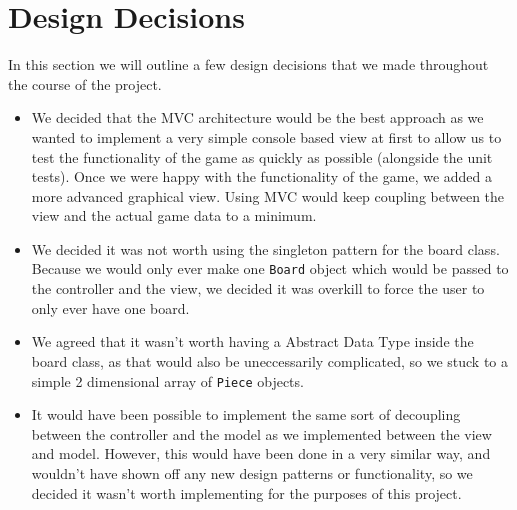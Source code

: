 \documentclass[11pt,a4paper,oneside]{article}
\begin{document}
\section*{Design Decisions}
In this section we will outline a few design decisions that we made throughout the course of the project.

\begin{itemize}
\item We decided that the MVC architecture would be the best approach as we wanted to implement a very simple console based view at first to allow us to test the functionality of the game as quickly as possible (alongside the unit tests). Once we were happy with the functionality of the game, we added a more advanced graphical view. Using MVC would keep coupling between the view and the actual game data to a minimum.

\item We decided it was not worth using the singleton pattern for the board class. Because we would only ever make one \texttt{Board} object which would be passed to the controller and the view, we decided it was overkill to force the user to only ever have one board.

\item We agreed that it wasn't worth having a Abstract Data Type inside the board class, as that would also be uneccessarily complicated, so we stuck to a simple 2 dimensional array of \texttt{Piece} objects.

\item It would have been possible to implement the same sort of decoupling between the controller and the model as we implemented between the view and model. However, this would have been done in a very similar way, and wouldn't have shown off any new design patterns or functionality, so we decided it wasn't worth implementing for the purposes of this project.
\end{itemize}
\end{document}
